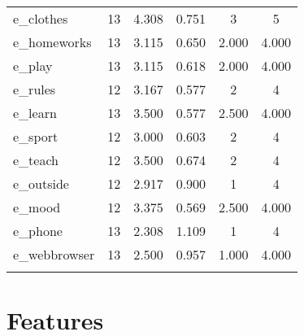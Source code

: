 \documentclass{article}
\begin{document}
\begin{table}[!htbp]
\begin{tabular}{@{\extracolsep{5pt}}lccccc}
e\_clothes & 13 & 4.308 & 0.751 & 3 & 5 \\ 
e\_homeworks & 13 & 3.115 & 0.650 & 2.000 & 4.000 \\ 
e\_play & 13 & 3.115 & 0.618 & 2.000 & 4.000 \\ 
e\_rules & 12 & 3.167 & 0.577 & 2 & 4 \\ 
e\_learn & 13 & 3.500 & 0.577 & 2.500 & 4.000 \\ 
e\_sport & 12 & 3.000 & 0.603 & 2 & 4 \\ 
e\_teach & 12 & 3.500 & 0.674 & 2 & 4 \\ 
e\_outside & 12 & 2.917 & 0.900 & 1 & 4 \\ 
e\_mood & 12 & 3.375 & 0.569 & 2.500 & 4.000 \\ 
e\_phone & 13 & 2.308 & 1.109 & 1 & 4 \\ 
e\_webbrowser & 13 & 2.500 & 0.957 & 1.000 & 4.000 \\ 
\hline \\[-1.8ex] 
\end{tabular} 
\end{table} 



\section{Features}
\end{document}
